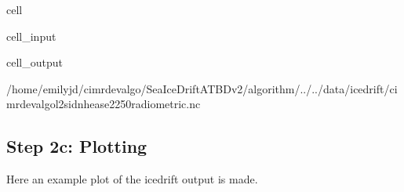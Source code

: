 \documentclass[letterpaper,10pt,english]{jupyterBook}
\begin{document}
\begin{sphinxuseclass}{cell}
\begin{sphinxVerbatimInput}
\begin{sphinxuseclass}{cell_input}
\begin{sphinxVerbatim}[commandchars=\\\{\}]
  

   
   
 
\end{sphinxVerbatim}

\end{sphinxuseclass}\end{sphinxVerbatimInput}
\begin{sphinxVerbatimOutput}

\begin{sphinxuseclass}{cell_output}
\begin{sphinxVerbatim}[commandchars=\\\{\}]
/home/emilyjd/cimr\PYGZhy{}devalgo/SeaIceDrift\PYGZus{}ATBD\PYGZus{}v2/algorithm/../../data/icedrift/cimr\PYGZus{}devalgo\PYGZus{}l2\PYGZus{}sid\PYGZus{}nh\PYGZhy{}ease2\PYGZhy{}250\PYGZus{}radiometric.nc
\end{sphinxVerbatim}

\end{sphinxuseclass}\end{sphinxVerbatimOutput}

\end{sphinxuseclass}

\subsection{Step 2c: Plotting}
\label{\detokenize{CIMR_L2_Sea_Ice_Drift_algorithm:step-2c-plotting}}
\sphinxAtStartPar
Here an example plot of the icedrift output is made.
\end{document}
